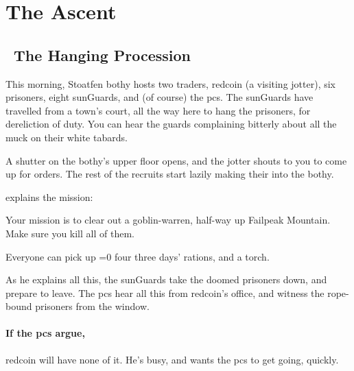 \section{The Ascent}


\begin{multicols}{2}

\subsection[The Hanging Procession]{~The Hanging Procession~}

\begin{boxtext}
  This morning, Stoatfen \gls{bothy} hosts two traders, \gls{redcoin} (a visiting \gls{jotter}), six prisoners, eight \glspl{sunGuard}, and (of course) the \glspl{pc}.
  The \glspl{sunGuard} have travelled from a town's \gls{court}, all the way here to hang the prisoners, for dereliction of duty.
  You can hear the guards complaining bitterly about all the muck on their white tabards.

  A shutter on the \gls{bothy}'s upper floor opens, and the \gls{jotter} shouts to you to come up for orders.
  The rest of the recruits start lazily making their into the \gls{bothy}.
\end{boxtext}

 explains the mission:

\begin{exampletext}
  Your mission is to clear out a goblin-warren, half-way up Failpeak Mountain.
  Make sure you kill all of them.

  Everyone can pick up \ifnum\value{temperature}=0 four \else three \fi days' rations, and a torch.
\end{exampletext}

\noindent
As he explains all this, the \glspl{sunGuard} take the doomed prisoners down, and prepare to leave.
The \glspl{pc} hear all this from \gls{redcoin}'s office, and witness the rope-bound prisoners from the window.


\paragraph{If the \glspl{pc} argue,}
\gls{redcoin} will have none of it.
He's busy, and wants the \glspl{pc} to get going, quickly.


\end{multicols}
